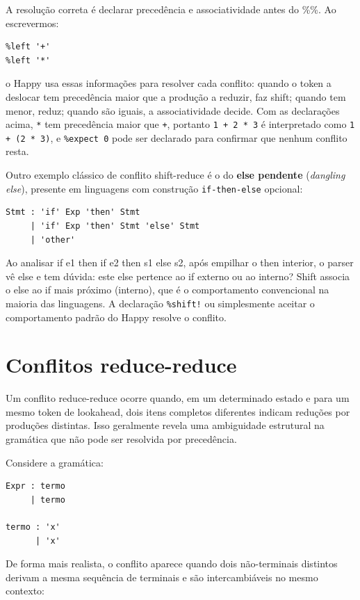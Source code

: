 A resolução correta é declarar precedência e associatividade antes do
\%\%. Ao escrevermos:

\begin{verbatim}
%left '+'
%left '*'
\end{verbatim}

o Happy usa essas informações para resolver cada conflito: quando o
token a deslocar tem precedência maior que a produção a reduzir, faz
shift; quando tem menor, reduz; quando são iguais, a associatividade
decide. Com as declarações acima, \verb|*| tem
precedência maior que \verb|+|, portanto
\verb|1 + 2 * 3| é interpretado como
\verb|1 + (2 * 3)|, e
\verb|%expect 0| pode ser declarado para
confirmar que nenhum conflito resta.

Outro exemplo clássico de conflito shift-reduce é o do \textbf{else
pendente} (\emph{dangling else}), presente em linguagens com
construção \verb|if-then-else| opcional:

\begin{verbatim}
Stmt : 'if' Exp 'then' Stmt
     | 'if' Exp 'then' Stmt 'else' Stmt
     | 'other'
\end{verbatim}

Ao analisar if e1 then if e2 then s1 else s2, após empilhar o
then interior, o parser vê else e tem dúvida: este
else pertence ao
if externo ou ao interno? Shift associa o
else ao if mais
próximo (interno), que é o comportamento convencional na maioria das
linguagens. A declaração \verb|%shift!| ou
simplesmente aceitar o comportamento padrão do Happy resolve o conflito.

\section{Conflitos reduce-reduce}

Um conflito reduce-reduce ocorre quando, em um determinado estado e
para um mesmo token de lookahead, dois itens completos diferentes
indicam reduções por produções distintas. Isso geralmente revela uma
ambiguidade estrutural na gramática que não pode ser resolvida por precedência.

Considere a gramática:

\begin{verbatim}
Expr : termo
     | termo

termo : 'x'
      | 'x'
\end{verbatim}

De forma mais realista, o conflito aparece quando dois não-terminais
distintos derivam a mesma sequência de terminais e são
intercambiáveis no mesmo contexto:

